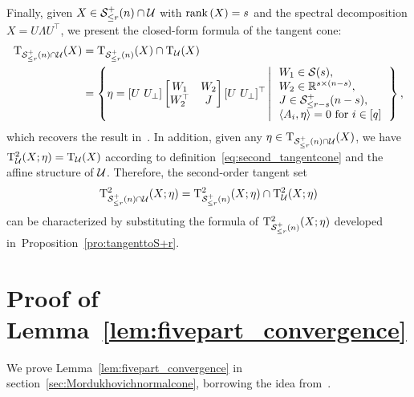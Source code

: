 Finally, given $X\in\mathcal{S}^+_{\le r}(n)\cap\mathcal{U}$ with $\operatorname{rank}{(X)}=s$ and the spectral decomposition $X=U\varLambda U^\top$, we present the closed-form formula of the tangent cone:
\begin{equation*}
\begin{aligned}
\mathrm{T}_{\mathcal{S}^+_{\le r}(n)\cap\mathcal{U}}(X)&= \mathrm{T}_{\mathcal{S}^+_{\le r}(n)}(X)\cap\mathrm{T}_{\mathcal{U}}(X)
\\
&=\left\{ {\eta = [U\ U_{\bot}]\left[ \begin{matrix}
        	W_1&		W_2\\
        	W_2^\top&		J\\
        \end{matrix} \right][U\ U_{\bot}]^\top \left|\,\begin{array}{l}
        W_1\in\mathcal{S}(s),
        \\
        W_2\in\mathbb{R}^{s\times (n-s)},
        \\
        J\in\mathcal{S}^+_{\le r-s}(n-s),
        \\
        \langle {A_i,\eta} \rangle=0\ \text{for}\ i\in[q]
        \end{array}\right.
        } \right\},
\end{aligned}
\end{equation*}
which recovers the result in~\cite[Corollary 4.12]{levin2025effect}. In addition, given any $\eta\in\mathrm{T}_{\mathcal{S}^+_{\le r}(n)\cap\mathcal{U}}(X)$, we have $\mathrm{T}^2_{\mathcal{U}}(X;\eta)=\mathrm{T}_{\mathcal{U}}(X) $ according to definition~\eqref{eq:second_tangentcone} and the affine structure of $\mathcal{U}$. Therefore, the second-order tangent set $$\mathrm{T}^2_{\mathcal{S}^+_{\le r}(n)\cap\mathcal{U}}(X;\eta)=\mathrm{T}^2_{\mathcal{S}^+_{\le r}(n)}(X;\eta)\cap\mathrm{T}^2_{\mathcal{U}}(X;\eta)$$ can be characterized by substituting the formula of $\mathrm{T}^2_{\mathcal{S}^+_{\le r}(n)}(X;\eta)$ developed in~Proposition~\ref{pro:tangenttoS+r}.




\section{Proof of Lemma~\ref{lem:fivepart_convergence}}\label{sec:proof_Mor}
We prove Lemma~\ref{lem:fivepart_convergence} in section~\ref{sec:Mordukhovichnormalcone}, borrowing the idea from~\cite[Lemma 4.2]{olikier2022continuity}.

\vspace{1mm}

